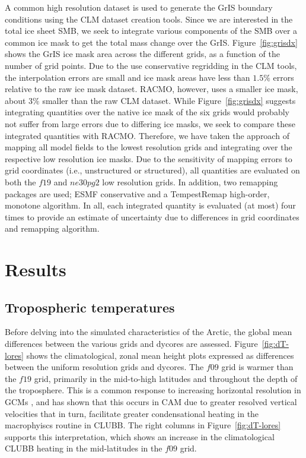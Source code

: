 \documentclass[draft]{agujournal2019}
\begin{document}
A common high resolution dataset is used to generate the GrIS boundary conditions using the CLM dataset creation tools. Since we are interested in the total ice sheet SMB, we seek to integrate various components of the SMB over a common ice mask to get the total mass change over the GrIS. Figure~\ref{fig:grisdx} shows the GrIS ice mask area across the different grids, as a function of the number of grid points. Due to the use conservative regridding in the CLM tools, the interpolation errors are small and ice mask areas have less than $1.5\%$ errors relative to the raw ice mask dataset. RACMO, however, uses a smaller ice mask, about $3\%$ smaller than the raw CLM dataset. While Figure~\ref{fig:grisdx} suggests integrating quantities over the native ice mask of the six grids would probably not suffer from large errors due to differing ice masks, we seek to compare these integrated quantities with RACMO. Therefore, we have taken the approach of mapping all model fields to the lowest resolution grids and integrating over the respective low resolution ice masks. Due to the sensitivity of mapping errors to grid coordinates (i.e., unstructured or structured), all quantities are evaluated on both the $f19$ and $ne30pg2$ low resolution grids. In addition, two remapping packages are used; ESMF conservative and a TempestRemap high-order, monotone algorithm. In all, each integrated quantity is evaluated (at most) four times to provide an estimate of uncertainty due to differences in grid coordinates and remapping algorithm.

\section{Results}\label{sec:results}

\subsection{Tropospheric temperatures}

Before delving into the simulated characteristics of the Arctic, the global mean differences between the various grids and dycores are assessed. Figure~\ref{fig:dT-lores} shows the climatological, zonal mean height plots expressed as differences between the uniform resolution grids and dycores. The $f09$ grid is warmer than the $f19$ grid, primarily in the mid-to-high latitudes and throughout the depth of the troposphere. This is a common response to increasing horizontal resolution in GCMs \cite{PS2002CD,RETAL2006JC}, and \cite{HK2020QJRMS} has shown that this occurs in CAM due to greater resolved vertical velocities that in turn, facilitate greater condensational heating in the macrophyiscs routine in CLUBB. The right columns in Figure~\ref{fig:dT-lores} supports this interpretation, which shows an increase in the climatological CLUBB heating in the mid-latitudes in the $f09$ grid. 
\end{document}

